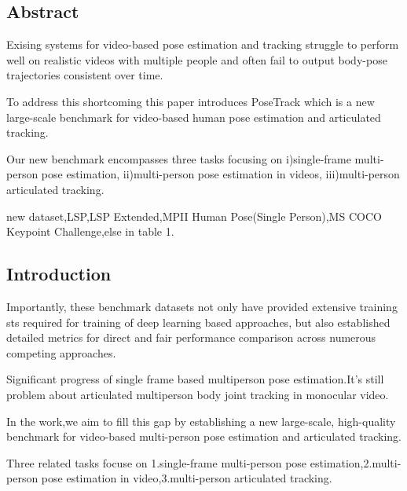 \documentclass[11pt]{article}
\begin{document}
\subsection{Abstract}

Exising systems for video-based pose estimation and tracking struggle to perform well on realistic videos with multiple people and often fail to output body-pose trajectories consistent over time.

To address this shortcoming this paper introduces PoseTrack which is a new large-scale benchmark for video-based human pose estimation and articulated tracking.

Our new benchmark encompasses three tasks focusing on i)single-frame multi-person pose estimation, ii)multi-person pose estimation in videos, iii)multi-person articulated tracking.

new dataset,LSP,LSP Extended,MPII Human Pose(Single Person),MS COCO Keypoint Challenge,else in table 1.

\subsection{Introduction}

Importantly, these benchmark datasets not only have provided extensive training sts required for training of deep learning based approaches, but also established detailed metrics for direct and fair performance comparison across numerous competing approaches.

Significant progress of single frame based multiperson pose estimation.It's still problem about articulated multiperson body joint tracking in monocular video.

In the work,we aim to fill this gap by establishing a new large-scale, high-quality benchmark for video-based multi-person pose estimation and articulated tracking. 

Three related tasks focuse on 1.single-frame multi-person pose estimation,2.multi-person pose estimation in video,3.multi-person articulated tracking.
\end{document}
